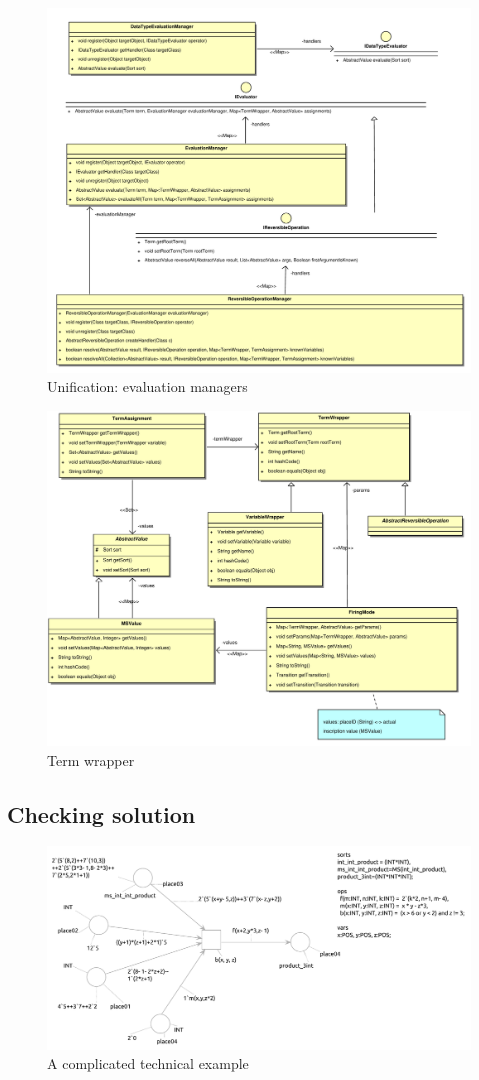 \begin{figure}[!htb]
  \includegraphics[scale=0.45]{img/evalManagers.pdf}
  \caption{Unification: evaluation managers}\label{fig:evalManagers}
\end{figure}

\begin{figure}[!htb]
  \includegraphics[scale=0.5]{img/termWrapper.pdf}
  \caption{Term wrapper}\label{fig:termWrapper}
\end{figure}

\subsection{Checking solution}\label{subs:check-solution}

\begin{figure}[!htb]
  \includegraphics[scale=0.6]{img/test19.pdf}
  \caption{A complicated technical example}\label{fig:test19}
\end{figure}
